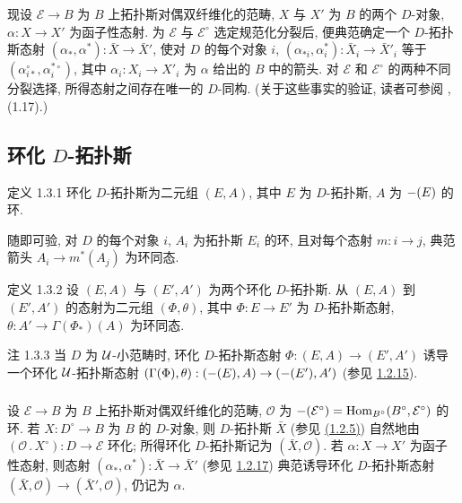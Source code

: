 现设 $\mathcal E\to B$ 为 $B$ 上拓扑斯对偶双纤维化的范畴,
$X$ 与 $X'$ 为 $B$ 的两个 $D$-对象, $\alpha:X\to X'$ 为函子性态射.
为 $\mathcal E$ 与 $\mathcal E^{\circ}$ 选定规范化分裂后,
便典范确定一个 $D$-拓扑斯态射 $(\alpha_{\ast},\alpha^{\ast}):\bar X\to\bar X'$,
使对 $D$ 的每个对象\pageoriginale{} $i$,
$(\alpha_{\ast i},\alpha_i^{\ast}):\bar X_i\to\bar X'_i$
等于 $(\alpha_{i\ast}^{\circ},\alpha_i^{\ast\circ})$,
其中 $\alpha_i:X_i\to X'_i$ 为 $\alpha$ 给出的 $B$ 中的箭头.
对 $\mathcal E$ 和 $\mathcal E^{\circ}$ 的两种不同分裂选择,
所得态射之间存在唯一的 $D$-同构.
(关于这些事实的验证, 读者可参阅 \cite{sga4.exp.Vbis.bib.4}, (1.17).)

\subsection{环化 $D$-拓扑斯}

\begin{enonce*}{定义 1.3.1}
环化 $D$-拓扑斯为二元组 $(E,A)$, 其中 $E$ 为 $D$-拓扑斯,
$A$ 为 $\Ysheaf{\Gamma}(E)$ 的环.
\end{enonce*}

随即可验, 对 $D$ 的每个对象 $i$, $A_i$ 为拓扑斯 $E_i$ 的环,
且对每个态射 $m:i\to j$, 典范箭头 $A_i\to m^{\ast}(A_j)$ 为环同态.

\begin{enonce*}{定义 1.3.2}
设 $(E,A)$ 与 $(E',A')$ 为两个环化 $D$-拓扑斯.
从 $(E,A)$ 到 $(E',A')$ 的态射为二元组 $(\Phi,\theta)$,
其中 $\Phi:E\to E'$ 为 $D$-拓扑斯态射,
$\theta:A'\to\Gamma(\Phi_{\ast})(A)$ 为环同态.
\end{enonce*}

\begin{enonce*}[remark]{注 1.3.3}
当 $D$ 为 ${\mathcal U}$-小范畴时, 环化 $D$-拓扑斯态射 $\Phi:(E,A)\to(E',A')$
诱导一个环化 ${\mathcal U}$-拓扑斯态射
$(\Gamma(\Phi),\theta):(\Ysheaf{\Gamma}(E),A)\to (\Ysheaf{\Gamma}(E'),A')$
(参见 \hyperref[Vbis.prop1.2.15]{1.2.15}).
\end{enonce*}

\setcounter{subsubsection}{3}
\subsubsection{}
设 $\mathcal E\to B$ 为 $B$ 上拓扑斯对偶双纤维化的范畴,
$\mathcal O$ 为 $\Ysheaf{\Gamma}(\mathcal E^{\circ})=\Hom_{B^{\circ}}(B^{\circ},\mathcal E^{\circ})$ 的环.
若 $X:D^{\circ}\to B$ 为 $B$ 的 $D$-对象, 则 $D$-拓扑斯 $\bar X$
(参见 \hyperref[Vbis.subsubsec1.2.5]{(1.2.5)})
自然地由 $(\mathcal O\mathbin{.}X^{\circ}):D\to\mathcal E$ 环化;
所得环化 $D$-拓扑斯记为 $(\bar X,\mathcal O)$.
若 $\alpha:X\to X'$ 为函子性态射, 则态射
$(\alpha_{\ast},\alpha^{\ast}):\bar X\to\bar X'$
(参见 \hyperref[Vbis.sch1.2.17]{1.2.17}) 典范诱导环化 $D$-拓扑斯态射
$(\bar X,\mathcal O)\to(\bar X',\mathcal O)$, 仍记为 $\alpha$.


